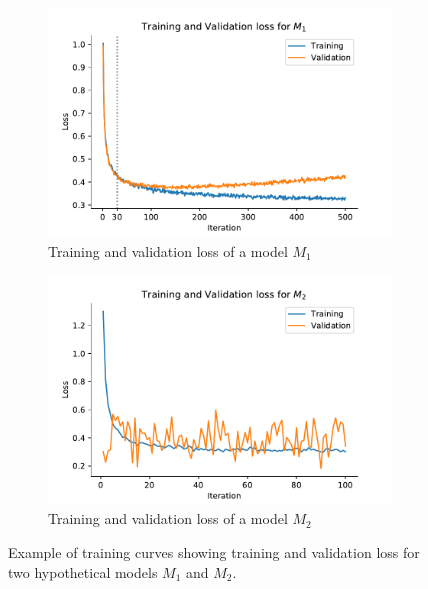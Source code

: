 \documentclass{article}
\begin{document}
\begin{figure}[bth]
    \centering
    \begin{subfigure}[b]{0.49\textwidth}
        \centering
        \includegraphics[width=0.95\linewidth]{figures/m1.pdf}
        \caption{Training and validation loss of a model $M_1$}
        \label{fig:m1}
    \end{subfigure}
    \centering
    \begin{subfigure}[b]{0.49\textwidth}
        \centering
        \includegraphics[width=0.95\linewidth]{figures/m2.pdf}
        \caption{Training and validation loss of a model $M_2$}
        \label{fig:m2}
    \end{subfigure}
    \caption{Example of training curves showing training and validation loss for two hypothetical models $M_1$ and $M_2$.}
\end{figure}
\end{document}

